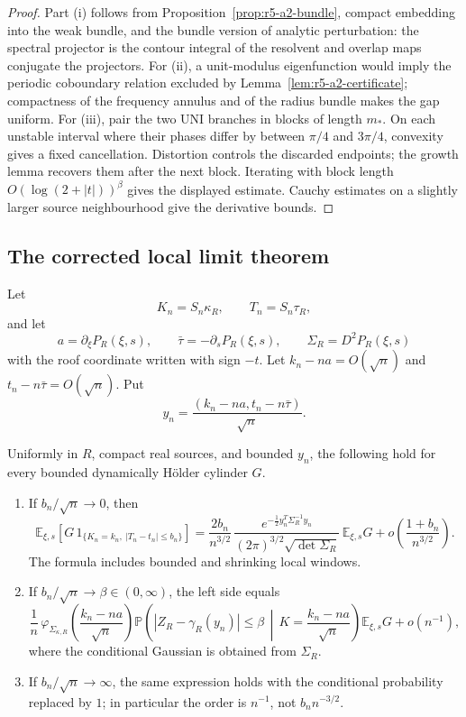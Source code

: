 \begin{proof}
Part (i) follows from Proposition~\ref{prop:r5-a2-bundle}, compact embedding
into the weak bundle, and the bundle version of analytic perturbation: the
spectral projector is the contour integral of the resolvent and overlap maps
conjugate the projectors.  For (ii), a unit-modulus eigenfunction would imply
the periodic coboundary relation excluded by
Lemma~\ref{lem:r5-a2-certificate}; compactness of the frequency annulus and
of the radius bundle makes the gap uniform.  For (iii), pair the two UNI
branches in blocks of length \(m_*\).  On each unstable interval where their
phases differ by between \(\pi/4\) and \(3\pi/4\), convexity gives a fixed
cancellation.  Distortion controls the discarded endpoints; the growth lemma
recovers them after the next block.  Iterating with block length
\(O(\log(2+|t|))^\beta\) gives the displayed estimate.  Cauchy estimates on a
slightly larger source neighbourhood give the derivative bounds.
\end{proof}

\subsection{The corrected local limit theorem}

Let
\[
 K_n=S_n\kappa_R,\qquad T_n=S_n\tau_R,
\]
and let
\[
 a=\partial_\xi P_R(\xi,s),\qquad
 \bar\tau=-\partial_sP_R(\xi,s),\qquad
 \Sigma_R=D^2P_R(\xi,s)
\]
with the roof coordinate written with sign \(-t\).  Let \(k_n-na=O(\sqrt n)\)
and \(t_n-n\bar\tau=O(\sqrt n)\).  Put
\[
 y_n=\frac{(k_n-na,t_n-n\bar\tau)}{\sqrt n}.
\]

\begin{theorem}
\label{thm:r5-a2-llt}
Uniformly in \(R\), compact real sources, and bounded \(y_n\), the following
hold for every bounded dynamically H\"older cylinder \(G\).
\begin{enumerate}[label=(\alph*)]
\item If \(b_n/\sqrt n\to0\), then
\[
 \mathbb E_{\xi,s}\!\left[
 G\,1_{\{K_n=k_n,\ |T_n-t_n|\le b_n\}}\right]
 =
 \frac{2b_n}{n^{3/2}}\,
 \frac{e^{-\frac12 y_n^T\Sigma_R^{-1}y_n}}
      {(2\pi)^{3/2}\sqrt{\det\Sigma_R}}\,
 \mathbb E_{\xi,s}G
 +o\!\left(\frac{1+b_n}{n^{3/2}}\right).
\]
The formula includes bounded and shrinking local windows.
\item If \(b_n/\sqrt n\to\beta\in(0,\infty)\), the left side equals
\[
 \frac1n\,\varphi_{\Sigma_{\kappa,R}}
 \!\left(\frac{k_n-na}{\sqrt n}\right)
 \mathbb P\!\left(
 |Z_R-\gamma_R(y_n)|\le\beta
 \,\middle|\,K=\frac{k_n-na}{\sqrt n}\right)
 \mathbb E_{\xi,s}G+o(n^{-1}),
\]
where the conditional Gaussian is obtained from \(\Sigma_R\).
\item If \(b_n/\sqrt n\to\infty\), the same expression holds with the
conditional probability replaced by \(1\); in particular the order is
\(n^{-1}\), not \(b_n n^{-3/2}\).
\end{enumerate}
\end{theorem}

